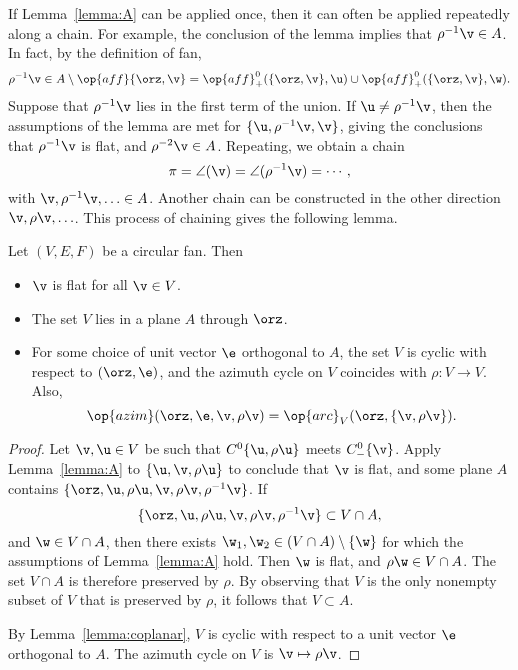 If Lemma~\ref{lemma:A} can be applied once, then it can often be
applied repeatedly along a chain.  For example, the conclusion of the
lemma implies that $\rho^{-1} \v \in A$.  In fact, by the definition
of fan,
\begin{displaymath}
  \rho^{-1}\v \in A \setminus \op{aff}\{\orz,\v\} 
= \op{aff}^0_+(\{\orz,\v\},\u) \cup \op{aff}^0_+(\{\orz,\v\},\w).
\end{displaymath}
Suppose that $\rho^{-1} \v$ lies in the first term of the union.  If
$\u\ne \rho^{-1}\v$, then the assumptions of the lemma are met for
$\{\u,\rho^{-1} \v,\v\}$, giving the conclusions that $\rho^{-1} \v$
is flat, and $\rho^{-2}\v\in A$.  Repeating, we obtain a chain
\begin{displaymath}
\pi=\angle(\v) = \angle(\rho^{-1} \v) = \cdots,
\end{displaymath}
with $\v,\rho^{-1}\v,\ldots\in A$.  Another chain can be constructed
in the other direction $\v,\rho \v,\ldots$.  This process of chaining
gives the following lemma.

\begin{lemma}\label{lemma:circular}
Let $(V,E,F)$ be a circular fan. Then
\begin{itemize}
\item $\v$ is flat for all $\v\in V$.
\item The set $V$ lies in a plane $A$ through $\orz$.
\item For some choice of unit vector $\e$ orthogonal to $A$, the set
$V$ is cyclic with respect to $(\orz,\e)$, and the azimuth cycle on
$V$ coincides with $\rho:V\to V$.  Also,
\begin{displaymath}
\op{azim}(\orz,\e,\v,\rho\v) = \op{arc}_V(\orz,\{\v,\rho \v\}).
\end{displaymath}
\end{itemize}
\end{lemma}

\begin{proof} Let $\v, \u\in V$ be such that $C^0\{\u,\rho \u\}$ meets
$C^0_-\{\v\}$.  Apply Lemma~\ref{lemma:A} to $\{\u,\v,\rho \u\}$ to
conclude that $\v$ is flat, and some plane $A$ contains
$\{\orz,\u,\rho\u,\v,\rho \v,\rho^{-1} \v\}$.  If
\begin{displaymath}
\{\orz,\u,\rho \u,\v,\rho \v,\rho^{-1} \v\} \subset V\cap A,
\end{displaymath}
and $\w\in V\cap A$, then there exists $\w_1,\w_2\in (V\cap
A)\setminus\{\w\}$ for which the assumptions of Lemma~\ref{lemma:A}
hold.  Then $\w$ is flat, and $\rho \w \in V\cap A$.  The set $V\cap
A$ is therefore preserved by $\rho$.  By observing that $V$ is the
only nonempty subset of $V$ that is preserved by $\rho$, it follows
that $V\subset A$.


By Lemma~\ref{lemma:coplanar}, $V$ is cyclic with respect to a unit
vector $\e$ orthogonal to $A$.  The azimuth cycle on $V$ is $\v
\mapsto \rho \v$.
\end{proof}

